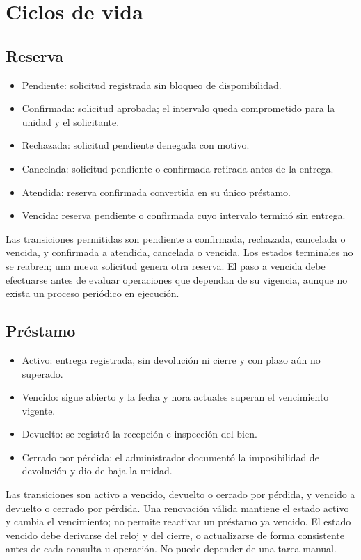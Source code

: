 \section{Ciclos de vida}
\label{sec:estados}

\subsection{Reserva}
\begin{itemize}
    \item Pendiente: solicitud registrada sin bloqueo de disponibilidad.
    \item Confirmada: solicitud aprobada; el intervalo queda comprometido para la unidad y el solicitante.
    \item Rechazada: solicitud pendiente denegada con motivo.
    \item Cancelada: solicitud pendiente o confirmada retirada antes de la entrega.
    \item Atendida: reserva confirmada convertida en su \'unico pr\'estamo.
    \item Vencida: reserva pendiente o confirmada cuyo intervalo termin\'o sin entrega.
\end{itemize}

Las transiciones permitidas son pendiente a confirmada, rechazada, cancelada o vencida, y confirmada a atendida, cancelada o vencida. Los estados terminales no se reabren; una nueva solicitud genera otra reserva. El paso a vencida debe efectuarse antes de evaluar operaciones que dependan de su vigencia, aunque no exista un proceso peri\'odico en ejecuci\'on.

\subsection{Pr\'estamo}
\begin{itemize}
    \item Activo: entrega registrada, sin devoluci\'on ni cierre y con plazo a\'un no superado.
    \item Vencido: sigue abierto y la fecha y hora actuales superan el vencimiento vigente.
    \item Devuelto: se registr\'o la recepci\'on e inspecci\'on del bien.
    \item Cerrado por p\'erdida: el administrador document\'o la imposibilidad de devoluci\'on y dio de baja la unidad.
\end{itemize}

Las transiciones son activo a vencido, devuelto o cerrado por p\'erdida, y vencido a devuelto o cerrado por p\'erdida. Una renovaci\'on v\'alida mantiene el estado activo y cambia el vencimiento; no permite reactivar un pr\'estamo ya vencido. El estado vencido debe derivarse del reloj y del cierre, o actualizarse de forma consistente antes de cada consulta u operaci\'on. No puede depender de una tarea manual.

